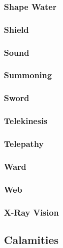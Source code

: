 \begin{multicols}{3}
\subsubsection*{Shape Water}
\subsubsection*{Shield}
\subsubsection*{Sound}
\subsubsection*{Summoning}
\subsubsection*{Sword}
\subsubsection*{Telekinesis}
\subsubsection*{Telepathy}
\subsubsection*{Ward}
\subsubsection*{Web}
\subsubsection*{X-Ray Vision}
\end{multicols}

\subsection{Calamities}